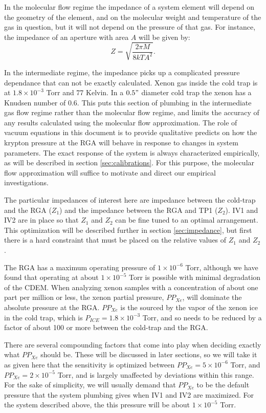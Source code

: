 \documentclass[12pt]{article}
\begin{document}
In the molecular flow regime the impedance of a system element will depend on the geometry of the element, and on the molecular weight and temperature of the gas in question, but it will not depend on the pressure of that gas. For instance, the impedance of an aperture with area $A$ will be given by:\cite{vac_eq}
\begin{equation}
\label{eq:aperture}
Z=\sqrt{\frac{2\pi M}{8kTA^{2}}}.
\end{equation}

In the intermediate regime, the impedance picks up a complicated pressure dependance that can not be exactly calculated. Xenon gas inside the cold trap is at $1.8\times 10^{-3}$ Torr and 77 Kelvin.\cite{vaporpressure} In a $0.5"$ diameter cold trap the xenon has a Knudsen number of 0.6. This puts this section of plumbing in the intermediate gas flow regime rather than the molecular flow regime, and limits the accuracy of any results calculated using the molecular flow approximation. The role of vacuum equations in this document is to provide qualitative predicts on how the krypton pressure at the RGA will behave in response to changes in system parameters. The exact response of the system is always characterized empirically, as will be described in section \ref{sec:calibrations}. For this purpose, the molecular flow approximation will suffice to motivate and direct our empirical investigations.\cite{vac_eq}

The particular impedances of interest here are impedance between the cold-trap and the RGA ($Z_1$) and the impedance between the RGA and TP1 ($Z_2$). IV1 and IV2 are in place so that $Z_1$ and $Z_2$ can be fine tuned to an optimal arrangement. This optimization will be described further in section \ref{sec:impedance}, but first there is a hard constraint that must be placed on the relative values of $Z_1$ and $Z_2$.

The RGA has a maximum operating pressure of $1\times 10^{-6}$ Torr, although we have found that operating at about $1\times 10^{-5}$ Torr is possible with minimal degradation of the CDEM. When analyzing xenon samples with a concentration of about one part per million or less, the xenon partial pressure, $PP_{Xe}$,  will dominate the absolute pressure at the RGA. $PP_{Xe}$ is the sourced by the vapor of the xenon ice in the cold trap, which is $P_{ICE}=1.8\times 10^{-3}$ Torr, and so needs to be reduced by a factor of about 100 or more between the cold-trap and the RGA\cite{vaporpressure}. 

There are several compounding factors that come into play when deciding exactly what $PP_{Xe}$ should be. These will be discussed in later sections, so we will take it as given here that the sensitivity is optimized between $PP_{Xe}=5\times10^{-6}$ Torr, and $PP_{Xe}=2\times10^{-5}$ Torr, and is largely unaffected by deviations within this range. For the sake of simplicity, we will usually demand that $PP_{Xe}$ to be the default pressure that the system plumbing gives when IV1 and IV2 are maximized. For the system described above, the this pressure will be about $1\times 10^{-5}$ Torr. 
\end{document}
